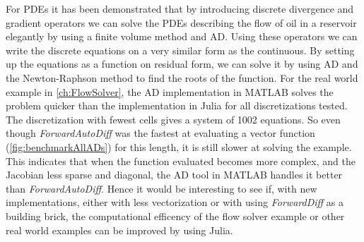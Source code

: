 For PDEs it has been demonstrated that by introducing discrete divergence and gradient operators we can solve the PDEs describing the flow of oil in a reservoir elegantly by using a finite volume method and AD. Using these operators we can write the discrete equations on a very similar form as the continuous. By setting up the equations as a function on residual form, we can solve it by using AD and the Newton-Raphson method to find the roots of the function. For the real world example in \autoref{ch:FlowSolver}, the AD implementation in MATLAB solves the problem quicker than the implementation in Julia for all discretizations tested. The discretization with fewest cells gives a system of 1002 equations. So even though \textit{ForwardAutoDiff} was the fastest at evaluating a vector function (\autoref{fig:benchmarkAllADs}) for this length, it is still slower at solving the example. This indicates that when the function evaluated becomes more complex, and the Jacobian less sparse and diagonal, the AD tool in MATLAB handles it better than \textit{ForwardAutoDiff}. Hence it would be interesting to see if, with new implementations, either with less vectorization or with using \textit{ForwardDiff} as a building brick, the computational efficency of the flow solver example or other real world examples can be improved by using Julia.

